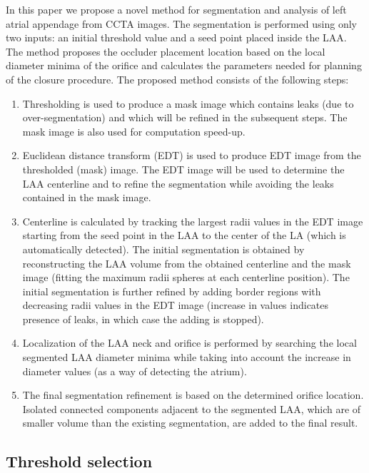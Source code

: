 \documentclass[review]{elsarticle}
\begin{document}
In this paper we propose a novel method for segmentation and analysis of  left
atrial appendage from CCTA images. The segmentation is performed using only two
inputs: an initial threshold value and a seed point placed inside the LAA. The
method proposes the occluder placement location based on the local diameter
minima of the orifice and calculates the parameters needed for planning of the
closure procedure.  The proposed method consists of the following steps: 
\begin{enumerate}
  \item Thresholding is used to produce a mask image which contains leaks 
    (due to over-segmentation) and which will be refined in the subsequent steps. 
    The mask image is also used for computation speed-up.
  \item 
      Euclidean distance transform (EDT) is used to produce EDT image from the 
      thresholded (mask) image. The EDT image will be used to determine the LAA centerline and 
      to refine the segmentation while avoiding the leaks contained in the mask image.
  \item Centerline is calculated by tracking the largest radii values in the 
     EDT image starting from the seed point in the LAA to the center of the LA 
    (which is automatically detected). The initial segmentation is obtained by 
    reconstructing the LAA volume from the obtained centerline and the mask image 
    (fitting the maximum radii  spheres at each centerline position). The initial 
    segmentation is further refined by adding border regions with decreasing radii 
    values in the  EDT image (increase in values indicates presence of leaks, 
    in which case the adding is stopped).
  \item Localization of the LAA neck and orifice is performed by searching the 
    local segmented LAA diameter minima while taking into account the increase in 
    diameter values (as a way of detecting the atrium). 
  \item The final segmentation refinement is based on the determined orifice location. 
    Isolated connected components adjacent to the segmented LAA, which are of 
    smaller volume than the existing segmentation, are added to the final result.
\end{enumerate}







\subsection{ Threshold selection}
\label{sec:threshold_selection}
\end{document}
